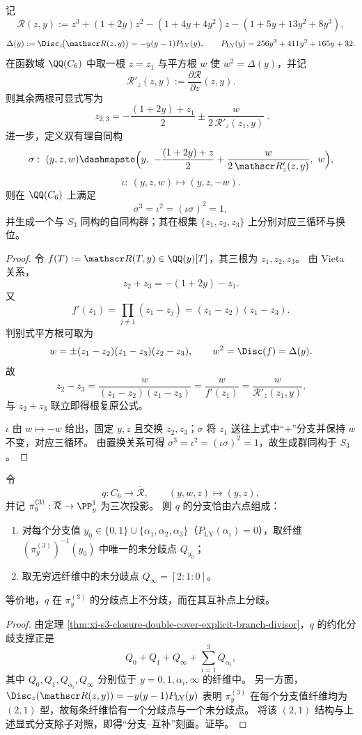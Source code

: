 \begin{theorem}\label{thm:xi-terminal-zm-s3-root-recovery-coordinate-automorphisms}
记
\[
\mathscr R(z,y):=z^3+(1+2y)z^2-(1+4y+4y^2)z-(1+5y+13y^2+8y^3),
\]
\[
\Delta(y):=\Disc_z\!\bigl(\mathscr R(z,y)\bigr)=-y(y-1)P_{\mathrm{LY}}(y),
\qquad
P_{\mathrm{LY}}(y)=256y^3+411y^2+165y+32.
\]
在函数域 \(\QQ(C_6)\) 中取一根 \(z=z_1\) 与平方根 \(w\) 使 \(w^2=\Delta(y)\)，并记
\[
\mathscr R'_z(z,y):=\frac{\partial\mathscr R}{\partial z}(z,y).
\]
则其余两根可显式写为
\[
\boxed{\;
z_{2,3}
=-\frac{(1+2y)+z_1}{2}
\pm
\frac{w}{2\,\mathscr R'_z(z_1,y)}\; }.
\]
进一步，定义双有理自同构
\[
\sigma:\ (y,z,w)\dashmapsto
\Bigl(
y,\ -\frac{(1+2y)+z}{2}+\frac{w}{2\,\mathscr R'_z(z,y)},\ w
\Bigr),
\]
\[
\iota:\ (y,z,w)\mapsto (y,z,-w).
\]
则在 \(\QQ(C_6)\) 上满足
\[
\sigma^3=\iota^2=(\iota\sigma)^2=1,
\]
并生成一个与 \(S_3\) 同构的自同构群；其在根集 \(\{z_1,z_2,z_3\}\) 上分别对应三循环与换位。
\end{theorem}
\begin{proof}
令 \(f(T):=\mathscr R(T,y)\in\QQ(y)[T]\)，其三根为 \(z_1,z_2,z_3\)。
由 Vieta 关系，
\[
z_2+z_3=-(1+2y)-z_1.
\]
又
\[
f'(z_1)=\prod_{j\neq1}(z_1-z_j)=(z_1-z_2)(z_1-z_3).
\]
判别式平方根可取为
\[
w=\pm (z_1-z_2)(z_1-z_3)(z_2-z_3),
\qquad
w^2=\Disc(f)=\Delta(y).
\]
故
\[
z_2-z_3=\frac{w}{(z_1-z_2)(z_1-z_3)}=\frac{w}{f'(z_1)}=\frac{w}{\mathscr R'_z(z_1,y)}.
\]
与 \(z_2+z_3\) 联立即得根复原公式。

\(\iota\) 由 \(w\mapsto-w\) 给出，固定 \(y,z\) 且交换 \(z_2,z_3\)；\(\sigma\) 将 \(z_1\) 送往上式中“\(+\)”分支并保持 \(w\) 不变，对应三循环。
由置换关系可得 \(\sigma^3=\iota^2=(\iota\sigma)^2=1\)，故生成群同构于 \(S_3\)。
\end{proof}

\begin{proposition}[二次商映射的分支互补性与六点分支除子]\label{prop:xi-terminal-zm-s3-double-cover-branch-complementarity}
令
\[
q:C_6\to \overline{\mathcal R},\qquad (y,w,z)\mapsto (y,z),
\]
并记 \(\pi_y^{(3)}:\overline{\mathcal R}\to\PP^1_y\) 为三次投影。
则 \(q\) 的分支恰由六点组成：
\begin{enumerate}
  \item 对每个分支值 \(y_0\in\{0,1\}\cup\{\alpha_1,\alpha_2,\alpha_3\}\)（\(P_{\mathrm{LY}}(\alpha_i)=0\)），取纤维 \((\pi_y^{(3)})^{-1}(y_0)\) 中唯一的未分歧点 \(Q_{y_0}\)；
  \item 取无穷远纤维中的未分歧点 \(Q_\infty=[2:1:0]\)。
\end{enumerate}
等价地，\(q\) 在 \(\pi_y^{(3)}\) 的分歧点上不分歧，而在其互补点上分歧。
\end{proposition}
\begin{proof}
由定理 \ref{thm:xi-s3-closure-double-cover-explicit-branch-divisor}，\(q\) 的约化分歧支撑正是
\[
Q_0+Q_1+Q_\infty+\sum_{i=1}^3Q_{\alpha_i},
\]
其中 \(Q_0,Q_1,Q_{\alpha_i},Q_\infty\) 分别位于 \(y=0,1,\alpha_i,\infty\) 的纤维中。
另一方面，\(\Disc_z(\mathscr R(z,y))=-y(y-1)P_{\mathrm{LY}}(y)\) 表明
\(\pi_y^{(3)}\) 在每个分支值纤维均为 \((2,1)\) 型，故每条纤维恰有一个分歧点与一个未分歧点。
将该 \((2,1)\) 结构与上述显式分支除子对照，即得“分支--互补”刻画。证毕。
\end{proof}

